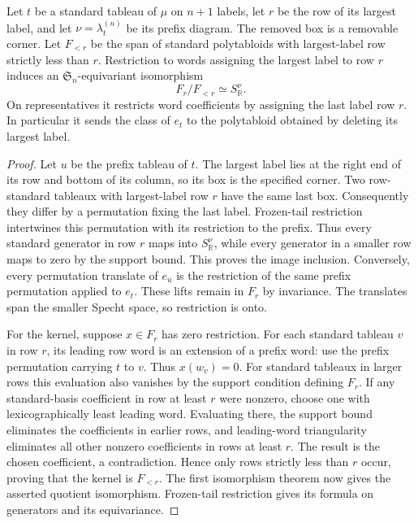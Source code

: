 \begin{lemma}
\label{lem:specht-branching-quotient}
\leanok
Let $t$ be a standard tableau of $\mu$ on $n+1$ labels, let $r$ be
the row of its largest label, and let $\nu=\lambda_t^{(n)}$ be its
prefix diagram. The removed box is a removable corner. Let $F_{<r}$ be the span of
standard polytabloids with largest-label row strictly less than $r$.
Restriction to words assigning the largest label to row $r$ induces
an $\mathfrak S_n$-equivariant isomorphism
\[
 F_r/F_{<r}\simeq S^\nu_{\mathbb R}.
\]
On representatives it restricts word coefficients by assigning the
last label row $r$. In particular it sends the class of $e_t$ to
the polytabloid obtained by deleting its largest label.
\end{lemma}
\begin{proof}
Let $u$ be the prefix tableau of $t$. The largest label lies at the right end of
its row and bottom of its column, so its box is the specified corner.
Two row-standard tableaux with largest-label row $r$ have the same
last box. Consequently they differ by a permutation fixing the last
label. Frozen-tail restriction intertwines this permutation with its
restriction to the prefix. Thus every standard generator in row $r$
maps into $S^\nu_{\mathbb R}$, while every generator in a smaller row
maps to zero by the support bound. This proves the image inclusion.
Conversely, every permutation translate of $e_u$ is the restriction
of the same prefix permutation applied to $e_t$. These lifts remain
in $F_r$ by invariance. The translates span the smaller Specht space,
so restriction is onto.

For the kernel, suppose $x\in F_r$ has zero restriction. For each
standard tableau $v$ in row $r$, its leading row word is an extension
of a prefix word: use the prefix permutation carrying $t$ to $v$.
Thus $x(w_v)=0$. For standard tableaux in larger rows this evaluation
also vanishes by the support condition defining $F_r$. If any
standard-basis coefficient in row at least $r$ were nonzero, choose
one with lexicographically least leading word. Evaluating there,
the support bound eliminates the coefficients in earlier rows, and
leading-word triangularity eliminates all other nonzero coefficients
in rows at least $r$. The result is the chosen coefficient, a
contradiction. Hence only rows strictly less than $r$ occur, proving
that the kernel is $F_{<r}$. The first isomorphism theorem now gives
the asserted quotient isomorphism. Frozen-tail restriction gives
its formula on generators and its equivariance.
\end{proof}

